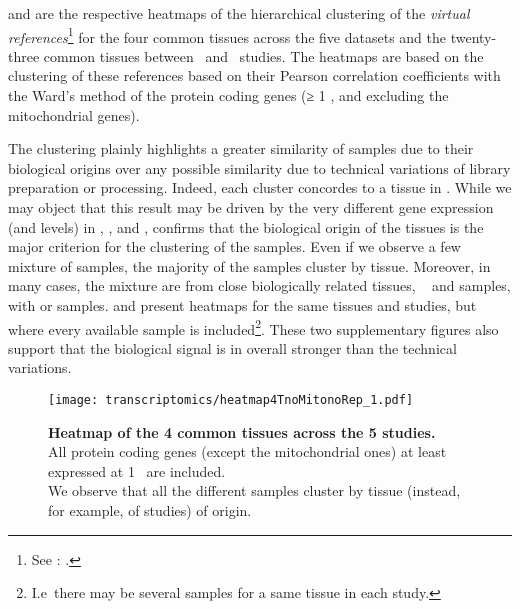  and 
are the respective heatmaps of the hierarchical clustering
of the \emph{virtual references}\footnote{See :
.}
for the four common tissues across the five datasets and the
twenty-three common tissues between \uhlen\ and \gtex\ studies.
The heatmaps are based on the clustering of these references based on
their Pearson correlation coefficients with the Ward's method
of the protein coding genes (≥ 1 \FPKM, and excluding
the mitochondrial genes).

The clustering plainly highlights a greater similarity of samples
due to their biological origins over any possible
similarity due to technical variations of library preparation or processing.
Indeed, each cluster concordes to a tissue in .
While we may object that this result may be driven by
the very different gene expression (and levels) in
, ,  and ,
 confirms that the biological origin of the tissues
is the major criterion for the clustering of the samples.
Even if we observe a few mixture of samples,
the majority of the samples cluster by tissue.
Moreover, in many cases, the mixture are from close biologically related tissues,
\eg\  and  samples, 
with  or  samples.
 and 
present heatmaps for the same tissues and studies,
but where every available sample is included\footnote{I.e\
there may be several samples for a same tissue in each study.}.
These two supplementary figures also support that
the biological signal is in overall stronger than the technical variations.

\begin{figure}[!tpb]
    \texttt{[image: transcriptomics/heatmap4TnoMitonoRep\_1.pdf]}\centering
    \caption[Heatmap of the 4 common tissues across the 5 studies]%
    {\label{fig:noMitoNoRep4T}\textbf{Heatmap of the 4 common tissues
    across the 5 studies.}\\All protein coding genes (except the mitochondrial
    ones) at least expressed at 1 \FPKM\ are included.\\We observe that all the
    different samples cluster by tissue (instead, for example, of studies)
    of origin.}
\end{figure}

